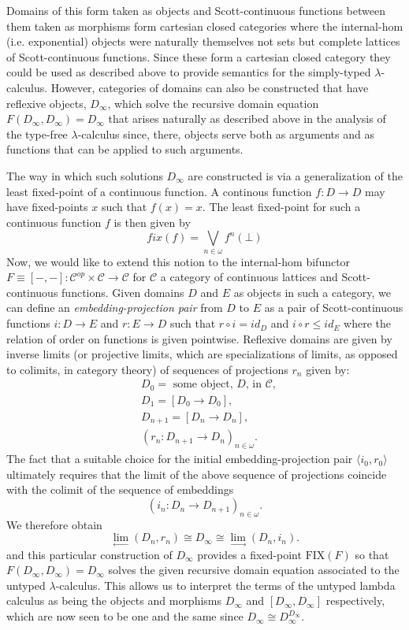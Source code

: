 Domains of this form taken as objects and Scott-continuous functions between them taken as morphisms form cartesian closed categories where the internal-hom (i.e. exponential) objects were naturally themselves not sets but complete lattices of Scott-continuous functions. Since these form a cartesian closed category they could be used as described above to provide semantics for the simply-typed $\lambda$-calculus. However, categories of domains can also be constructed that have reflexive objects, $D_\infty$, which solve the recursive domain equation $F(D_{\infty},D_{\infty})=D_{\infty}$ that arises naturally as described above in the analysis of the type-free $\lambda$-calculus since, there, objects serve both as arguments and as functions that can be applied to such arguments.

The way in which such solutions $D_\infty$ are constructed is via a generalization of the least fixed-point of a continuous function. A continous function $f \colon D \rightarrow D$ may have fixed-points $x$ such that $f(x)=x$. The least fixed-point for such a continuous function $f$ is then given by
$$
fix(f) = \bigvee_{n \in \omega} f^n(\bot)
$$
Now, we would like to extend this notion to the internal-hom bifunctor $F \equiv [-,-] \colon \mathcal{C}^{op} \times \mathcal{C} \rightarrow \mathcal{C}$ for $\mathcal{C}$ a category of continuous lattices and Scott-continuous functions. Given domains $D$ and $E$ as objects in such a category, we can define an \emph{embedding-projection pair} from $D$ to $E$ as a pair of Scott-continuous functions $i \colon D \rightarrow E$ and $r \colon E \rightarrow D$ such that $r \circ i = id_D$ and $i \circ r \leq id_E$ where the relation of order on functions is given pointwise. Reflexive domains are given by inverse limits (or projective limits, which are specializations of limits, as opposed to colimits, in category theory) of sequences of projections $r_n$ given by:
\begin{align*}
&D_0 = \mbox{ some object, $D$, in } \mathcal{C},\\
&D_1 = [D_0 \rightarrow D_0],\\
&D_{n+1} = [D_n \rightarrow D_n],\\
&(r_n \colon D_{n+1} \rightarrow D_n)_{n \in \omega}.
\end{align*}
The fact that a suitable choice for the initial embedding-projection pair $\langle i_0, r_0 \rangle$ ultimately requires that the limit of the above sequence of projections coincide with the colimit of the sequence of embeddings
$$
(i_n \colon D_{n} \rightarrow D_{n+1})_{n \in \omega}.
$$
We therefore obtain
$$
\lim_{\leftarrow} (D_n, r_n) \cong D_\infty \cong \lim_{\rightarrow} (D_n, i_n).
$$
and this particular construction of $D_{\infty}$ provides a fixed-point $\text{FIX}(F)$ so that $F(D_{\infty},D_{\infty}) = D_{\infty}$ solves the given recursive domain equation associated to the untyped $\lambda$-calculus. This allows us to interpret the terms of the untyped lambda calculus as being the objects and morphisms $D_{\infty}$ and $[D_{\infty},D_{\infty}]$ respectively, which are now seen to be one and the same since $D_{\infty} \cong D_{\infty}^{D_{\infty}}$.

